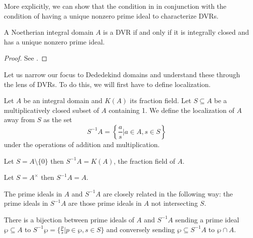 More explicitly, we can show that the condition in  in conjunction with the condition of having a unique nonzero prime ideal to characterize DVRs. 
\begin{proposition}\label{prop:DVR iff integrally closed and unique nonzero prime}
  A Noetherian integral domain $A$ is a DVR if and only if it is integrally closed and has a unique nonzero prime ideal. 
\end{proposition}
\begin{proof}
  See \cite[Ch. 1, \S 2, Prop. 3]{Serre}. 
\end{proof}
Let us narrow our focus to Dededekind domains and understand these through the lens of DVRs. To do this, we will first have to define localization. 
\begin{definition}[Localization]
  Let $A$ be an integral domain and $K(A)$ its fraction field. Let $S\subseteq A$ be a multiplicatively closed subset of $A$ containing 1. We define the localization of $A$ away from $S$ as the set 
  $$S^{-1}A=\left\{\frac{a}{s}|a\in A, s\in S\right\}$$
  under the operations of addition and multiplication.
\end{definition}
\begin{example}
  Let $S=A\setminus\{0\}$ then $S^{-1}A=K(A)$, the fraction field of $A$. 
\end{example}
\begin{example}
  Let $S=A^{\times}$ then $S^{-1}A=A$. 
\end{example}
The prime ideals in $A$ and $S^{-1}A$ are closely related in the following way: the prime ideals in $S^{-1}A$ are those prime ideals in $A$ not intersecting $S$. 
\begin{proposition}\label{prop:localization correspondence}
  There is a bijection between prime ideals of $A$ and $S^{-1}A$ sending a prime ideal $\wp\subseteq A$ to $S^{-1}\wp=\{\frac{p}{s}|p\in\wp,s\in S\}$ and conversely sending $\wp\subseteq S^{-1}A$ to $\wp\cap A$. 
\end{proposition}
